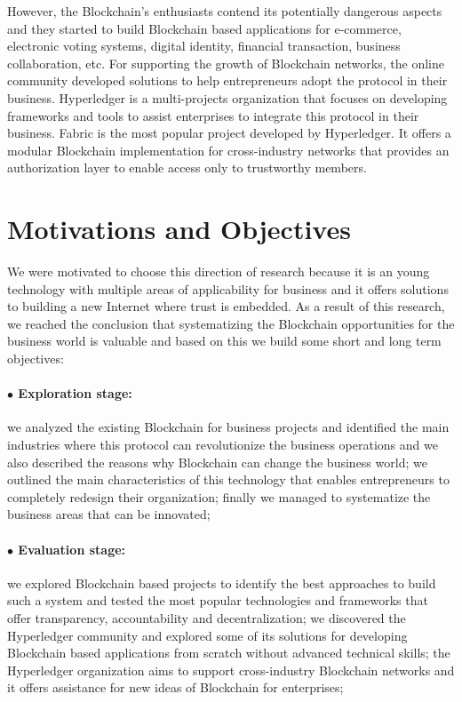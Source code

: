 However, the Blockchain's enthusiasts contend its potentially dangerous aspects and they started to build Blockchain based applications for e-commerce, electronic voting systems, digital identity, financial transaction, business collaboration, etc. For supporting the growth of Blockchain networks, the online community developed solutions to help entrepreneurs adopt the protocol in their business. 
Hyperledger is a multi-projects organization that focuses on developing frameworks and tools to assist enterprises to integrate this protocol in their business.
Fabric is the most popular project developed by Hyperledger. It offers a modular Blockchain implementation for cross-industry networks that provides an authorization layer to enable access only to trustworthy members. 


\section{Motivations and Objectives}
\label{sec:intro-section2}
We were motivated to choose this direction of research because it is an young technology with multiple areas of applicability for business and it offers solutions to building a new Internet where trust is embedded. As a result of this research, we reached the conclusion that systematizing the Blockchain opportunities for the business world is valuable and based on this we build some short and long term objectives:

\paragraph{$\bullet$ Exploration stage:} we analyzed the existing Blockchain for business projects and identified the main industries  where this protocol can revolutionize the business operations and we also described the reasons why Blockchain can change the business world; we outlined the main characteristics of this technology that enables entrepreneurs to completely redesign their organization; finally we managed to systematize the business areas that can be innovated;
	
\paragraph{$\bullet$ Evaluation stage:} we explored Blockchain based projects to identify the best approaches to build such a system and tested the most popular technologies and frameworks that offer transparency, accountability and decentralization; we discovered the Hyperledger community and explored some of its solutions for developing Blockchain based applications from scratch without advanced technical skills; the Hyperledger organization aims to support cross-industry Blockchain networks and it offers assistance for new ideas of Blockchain for enterprises;
	
